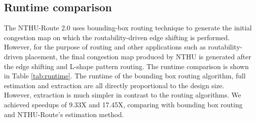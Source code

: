\subsection{Runtime comparison}
The NTHU-Route 2.0 uses bounding-box routing technique to generate the initial congestion map on which the routability-driven edge shifting is performed. However, for the purpose of routing and other applications such as routability-driven placement, the final congestion map produced by NTHU is generated after the edge shifting and L-shape pattern routing. The runtime comparison is shown in Table \ref{tab:runtime}. The runtime of the bounding box routing algorithm, full estimation and extraction are all directly proportional to the design size. However, extraction is much simpler in contrast to the routing algorithms. We achieved speedups of 9.33X and 17.45X, comparing with bounding box routing and NTHU-Route's estimation method.
